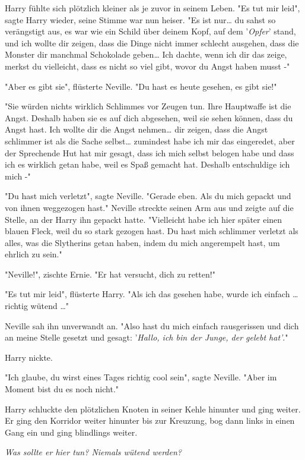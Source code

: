 {Harry fühlte sich plötzlich kleiner als je zuvor in seinem Leben. "Es tut mir leid", sagte Harry wieder, seine Stimme war nun heiser. "Es ist nur… du sahst so verängstigt aus, es war wie ein Schild über deinem Kopf, auf dem '\emph{Opfer}' stand, und ich wollte dir zeigen, dass die Dinge nicht immer schlecht ausgehen, dass die Monster dir manchmal Schokolade geben… Ich dachte, wenn ich dir das zeige, merkst du vielleicht, dass es nicht so viel gibt, wovor du Angst haben musst -"

"Aber es gibt sie", flüsterte Neville. "Du hast es heute gesehen, es gibt sie!"

"Sie würden nichts wirklich Schlimmes vor Zeugen tun. Ihre Hauptwaffe ist die Angst. Deshalb haben sie es auf dich abgesehen, weil sie sehen können, dass du Angst hast. Ich wollte dir die Angst nehmen… dir zeigen, dass die Angst schlimmer ist als die Sache selbst… zumindest habe ich mir das eingeredet, aber der Sprechende Hut hat mir gesagt, dass ich mich selbst belogen habe und dass ich es wirklich getan habe, weil es Spaß gemacht hat. Deshalb entschuldige ich mich -"

"Du hast mich verletzt", sagte Neville. "Gerade eben. Als du mich gepackt und von ihnen weggezogen hast." Neville streckte seinen Arm aus und zeigte auf die Stelle, an der Harry ihn gepackt hatte. "Vielleicht habe ich hier später einen blauen Fleck, weil du so stark gezogen hast. Du hast mich schlimmer verletzt als alles, was die Slytherins getan haben, indem du mich angerempelt hast, um ehrlich zu sein."

"Neville!", zischte Ernie. "Er hat versucht, dich zu retten!"

"Es tut mir leid", flüsterte Harry. "Als ich das gesehen habe, wurde ich einfach … richtig wütend …"

Neville sah ihn unverwandt an. "Also hast du mich einfach rausgerissen und dich an meine Stelle gesetzt und gesagt: '\emph{Hallo, ich bin der Junge, der gelebt hat'}."

Harry nickte.

"Ich glaube, du wirst eines Tages richtig cool sein", sagte Neville. "Aber im Moment bist du es noch nicht."

Harry schluckte den plötzlichen Knoten in seiner Kehle hinunter und ging weiter. Er ging den Korridor weiter hinunter bis zur Kreuzung, bog dann links in einen Gang ein und ging blindlings weiter.

\emph{Was sollte er hier tun? Niemals wütend werden?}

}
